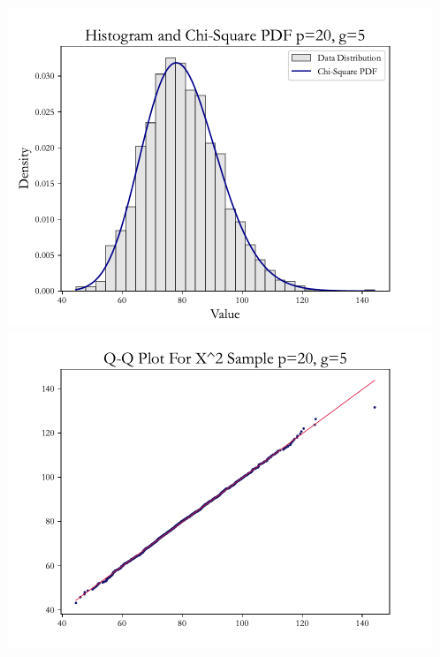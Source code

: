 \documentclass{article} %
\begin{document}
\begin{figure}[H]
\begin{minipage}[b]{0.49\textwidth}
        \includegraphics[width=\textwidth]{img/b/hist_plot_p=20_g=5.pdf}
    \end{minipage}
    \hfill
    \begin{minipage}[b]{0.49\textwidth}
        \centering
        \includegraphics[width=\textwidth]{img/b/qq_plot_p=20_g=5.pdf}
    \end{minipage}
    \hfill
    \begin{minipage}[b]{0.49\textwidth}
        \centering

\end{minipage}
\end{figure}
\end{document}
